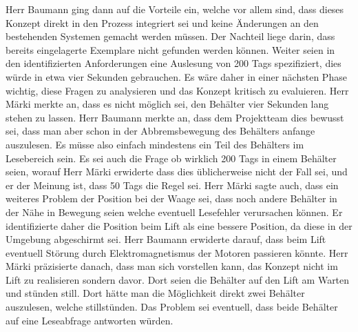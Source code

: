 \documentclass[parskip=full, a4paper]{scrreprt}
\begin{document}
Herr Baumann ging dann auf die Vorteile ein, welche vor allem sind, dass dieses Konzept direkt in den Prozess integriert sei und keine Änderungen an den bestehenden Systemen gemacht werden müssen. Der Nachteil liege darin, dass bereits eingelagerte Exemplare nicht gefunden werden können. Weiter seien in den identifizierten Anforderungen eine Auslesung von 200 Tags spezifiziert, dies würde in etwa vier Sekunden gebrauchen. Es wäre daher in einer nächsten Phase wichtig, diese Fragen zu analysieren und das Konzept kritisch zu evaluieren. Herr Märki merkte an, dass es nicht möglich sei, den Behälter vier Sekunden lang stehen zu lassen. Herr Baumann merkte an, dass dem Projektteam dies bewusst sei, dass man aber schon in der Abbremsbewegung des Behälters anfange auszulesen. Es müsse also einfach mindestens ein Teil des Behälters im Lesebereich sein. Es sei auch die Frage ob wirklich 200 Tags in einem Behälter seien, worauf Herr Märki erwiderte dass dies üblicherweise nicht der Fall sei, und er der Meinung ist, dass 50 Tags die Regel sei. Herr Märki sagte auch, dass ein weiteres Problem der Position bei der Waage sei, dass noch andere Behälter in der Nähe in Bewegung seien welche eventuell Lesefehler verursachen können. Er identifizierte daher die Position beim Lift als eine bessere Position, da diese in der Umgebung abgeschirmt sei. Herr Baumann erwiderte darauf, dass beim Lift eventuell Störung durch Elektromagnetismus der Motoren passieren könnte. Herr Märki präzisierte danach, dass man sich vorstellen kann, das Konzept nicht im Lift zu realisieren sondern davor. Dort seien die Behälter auf den Lift am Warten und stünden still. Dort hätte man die Möglichkeit direkt zwei Behälter auszulesen, welche stillstünden. Das Problem sei eventuell, dass beide Behälter auf eine Leseabfrage antworten würden.
\end{document}
